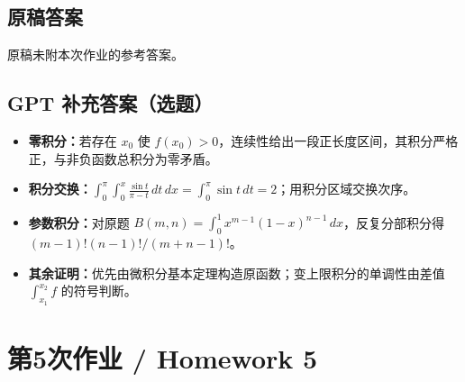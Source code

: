 \documentclass[UTF8,11pt, a4paper, oneside, fontset=none]{ctexbook}
\begin{document}
\subsection*{原稿答案}
\noindent 原稿未附本次作业的参考答案。
\clearpage
\subsection*{GPT 补充答案（选题）}
\begin{itemize}
\item \textbf{零积分：}若存在 $x_0$ 使 $f(x_0)>0$，连续性给出一段正长度区间，其积分严格正，与非负函数总积分为零矛盾。
\item \textbf{积分交换：}$\int_0^\pi\int_0^x\frac{\sin t}{\pi-t}\,dt\,dx=\int_0^\pi\sin t\,dt=2$；用积分区域交换次序。
\item \textbf{参数积分：}对原题 $B(m,n)=\int_0^1x^{m-1}(1-x)^{n-1}\,dx$，反复分部积分得 $(m-1)!(n-1)!/(m+n-1)!$。
\item \textbf{其余证明：}优先由微积分基本定理构造原函数；变上限积分的单调性由差值 $\int_{x_1}^{x_2}f$ 的符号判断。
\end{itemize}
\clearpage
\section{第5次作业 / Homework 5}
\end{document}
